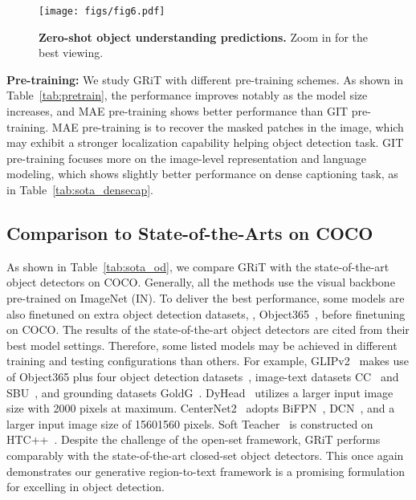 \documentclass[10pt,twocolumn,letterpaper]{article}
\newcommand{\myparagraph}[1]{{\vspace{0.5em} \noindent \bf #1}}
\begin{document}
\begin{figure*}[t!]
	\vspace{-1mm}
	\centering
	\texttt{[image: figs/fig6.pdf]}
	\vspace{-5mm}
	\caption{\textbf{Zero-shot object understanding predictions.} Zoom in for the best viewing.}
	\vspace{-2mm}
	\label{fig:fig6}
\end{figure*}

\myparagraph{Pre-training:} We study GRiT with different pre-training schemes. As shown in Table~\ref{tab:pretrain}, the performance improves notably as the model size increases, and MAE pre-training shows better performance than GIT pre-training. MAE pre-training is to recover the masked patches in the image, which may exhibit a stronger localization capability helping object detection task. GIT pre-training focuses more on the image-level representation and language modeling, which shows slightly better performance on dense captioning task, as in Table~\ref{tab:sota_densecap}.

\subsection{Comparison to State-of-the-Arts on COCO}
As shown in Table~\ref{tab:sota_od}, we compare GRiT with the state-of-the-art object detectors on COCO. Generally, all the methods use the visual backbone pre-trained on ImageNet (IN). To deliver the best performance, some models are also finetuned on extra object detection datasets, \eg, Object365~\cite{shao2019objects365}, before finetuning on COCO. The results of the state-of-the-art object detectors are cited from their best model settings. Therefore, some listed models may be achieved in different training and testing configurations than others. For example, GLIPv2~\cite{zhang2022glipv2} makes use of Object365 plus four object detection datasets~\cite{zhang2022glipv2}, image-text datasets CC~\cite{sharma2018conceptual} and SBU~\cite{ordonez2011im2text}, and grounding datasets GoldG~\cite{zhang2022glipv2}. DyHead~\cite{dai2021dynamic} utilizes a larger input image size with 2000 pixels at maximum. CenterNet2~\cite{zhou2021probabilistic} adopts BiFPN~\cite{tan2020efficientdet}, DCN~\cite{dai2017deformable}, and a larger input image size of 15601560 pixels.  Soft Teacher~\cite{xu2021end} is constructed on HTC++~\cite{liu2021swin}. Despite the challenge of the open-set framework, GRiT performs comparably with the state-of-the-art closed-set object detectors. This once again demonstrates our generative region-to-text framework is a promising formulation for excelling in object detection. 
\end{document}
